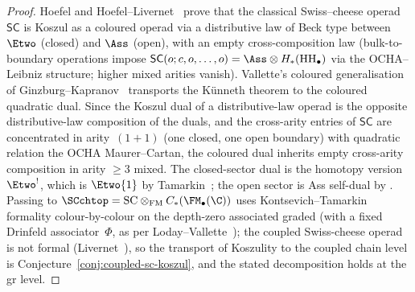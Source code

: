 \begin{proof}
Hoefel and Hoefel--Livernet~\cite{Hoe09,HL12} prove that the
classical Swiss--cheese operad $\mathsf{SC}$ is Koszul as a
coloured operad via a distributive law of Beck type between
$\Etwo$ (closed) and $\Ass$ (open), with an empty cross-composition
law (bulk-to-boundary operations impose $\mathsf{SC}(o;c,o,\ldots,o) =
\Ass \otimes H_\ast(\mathrm{HH}_\bullet)$ via the OCHA--Leibniz
structure; higher mixed arities vanish). Vallette's coloured
generalisation of Ginzburg--Kapranov~\cite{Val07} transports the
Künneth theorem to the coloured quadratic dual. Since the
Koszul dual of a distributive-law operad is the opposite
distributive-law composition of the duals, and the cross-arity
entries of $\mathsf{SC}$ are concentrated in arity~$(1{+}1)$ (one
closed, one open boundary) with quadratic relation the OCHA
Maurer--Cartan, the coloured dual inherits empty cross-arity
composition in arity $\ge 3$ mixed. The closed-sector dual is
the homotopy version $\Etwo^{!}$, which is $\Etwo\{1\}$ by
Tamarkin~\cite{Tam03}; the open sector is Ass self-dual by
\cite{GK94}. Passing to $\SCchtop = \mathrm{SC} \otimes_{\mathrm{FM}}
C_\ast(\FM_\bullet(\C))$ uses Kontsevich--Tamarkin formality
colour-by-colour on the depth-zero associated graded (with a fixed
Drinfeld associator~$\Phi$, as per Loday--Vallette~\cite{LV12});
the coupled Swiss-cheese operad is not formal
(Livernet~\cite{Liv15}), so the transport of Koszulity to the
coupled chain level is Conjecture~\ref{conj:coupled-sc-koszul},
and the stated decomposition holds at the gr level.
\end{proof}

